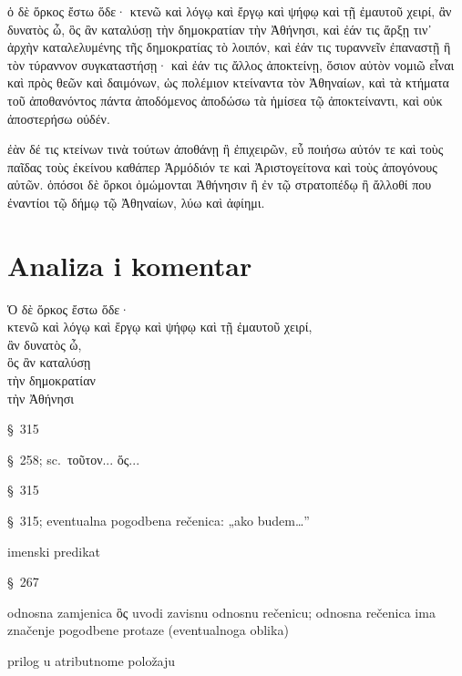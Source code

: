 {\large

\begin{greek}

\noindent ὁ δὲ ὅρκος ἔστω ὅδε· κτενῶ καὶ λόγῳ καὶ ἔργῳ καὶ ψήφῳ καὶ τῇ ἐμαυτοῦ χειρί, ἂν δυνατὸς ὦ, ὃς ἂν καταλύσῃ τὴν δημοκρατίαν τὴν Ἀθήνησι, καὶ ἐάν τις ἄρξῃ τιν᾽ ἀρχὴν καταλελυμένης τῆς δημοκρατίας τὸ λοιπόν, καὶ ἐάν τις τυραννεῖν ἐπαναστῇ ἢ τὸν τύραννον συγκαταστήσῃ· καὶ ἐάν τις ἄλλος ἀποκτείνῃ, ὅσιον αὐτὸν νομιῶ εἶναι καὶ πρὸς θεῶν καὶ δαιμόνων, ὡς πολέμιον κτείναντα τὸν Ἀθηναίων, καὶ τὰ κτήματα τοῦ ἀποθανόντος πάντα ἀποδόμενος ἀποδώσω τὰ ἡμίσεα τῷ ἀποκτείναντι, καὶ οὐκ ἀποστερήσω οὐδέν.

ἐὰν δέ τις κτείνων τινὰ τούτων ἀποθάνῃ ἢ ἐπιχειρῶν, εὖ ποιήσω αὐτόν τε καὶ τοὺς παῖδας τοὺς ἐκείνου καθάπερ Ἁρμόδιόν τε καὶ Ἀριστογείτονα καὶ τοὺς ἀπογόνους αὐτῶν. ὁπόσοι δὲ ὅρκοι ὀμώμονται Ἀθήνησιν ἢ ἐν τῷ στρατοπέδῳ ἢ ἄλλοθί που ἐναντίοι τῷ δήμῳ τῷ Ἀθηναίων, λύω καὶ ἀφίημι.

\end{greek}

}


\section*{Analiza i komentar}


{\large
\begin{greek}
\noindent Ὁ δὲ ὅρκος ἔστω ὅδε·  \\
\tabto{2em} κτενῶ καὶ λόγῳ καὶ ἔργῳ καὶ ψήφῳ καὶ τῇ ἐμαυτοῦ χειρί, \\
\tabto{4em} ἂν δυνατὸς ὦ, \\
\tabto{2em} ὃς ἂν καταλύσῃ \\
\tabto{4em} τὴν δημοκρατίαν \\
\tabto{6em} τὴν Ἀθήνησι\\

\end{greek}
}

\begin{description}[noitemsep,topsep=0pt]
\item[ἔστω] §~315
\item[κτενῶ] §~258; sc.\ τοῦτον... ὅς...
\item[ὦ] §~315
\item[ἂν δυνατὸς ὦ] §~315; eventualna pogodbena rečenica: „ako budem…”
\item[δυνατὸς ὦ] imenski predikat
\item[καταλύσῃ] §~267
\item[ὃς ἂν καταλύσῃ] odnosna zamjenica ὃς uvodi zavisnu odnosnu rečenicu; odnosna rečenica ima značenje pogodbene protaze (eventualnoga oblika)
\item[τὴν δημοκρατίαν τὴν Ἀθήνησι] prilog u atributnome položaju

\end{description}

